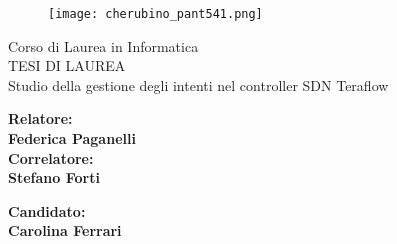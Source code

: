 \documentclass[12pt]{report}
\begin{document}
\begin{titlepage}
\begin{figure}
    \centering\texttt{[image: cherubino\_pant541.png]}
\end{figure}

\begin{center}
    {\LARGE{ Corso di Laurea in Informatica \\}}
    \vspace{2cm}
    {\Large { TESI DI LAUREA }}\\
    \vspace{2cm}
    {\Large { Studio della gestione degli intenti nel controller SDN Teraflow }}
\end{center}

\vspace{2cm}

\begin{minipage}[t]{0.47\textwidth}
	{\large{\bf Relatore:\\ Federica Paganelli}}
	\vspace{0.5cm}
	{\large{\bf \\Correlatore:\\ Stefano Forti}}
\end{minipage}\hfill\begin{minipage}[t]{0.47\textwidth}\raggedleft
	{\large{\bf Candidato: \\ Carolina Ferrari\\ }}
\end{minipage}

\vspace{25mm}

\end{titlepage}

\tableofcontents
\thispagestyle{empty}
\listoffigures

\thispagestyle{empty}
\clearpage
\setcounter{page}{1}



\clearpage







%

 

\end{document}
